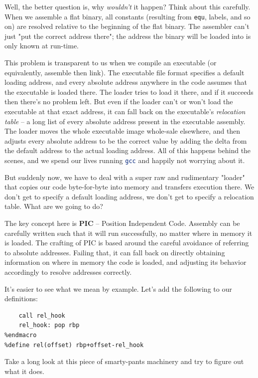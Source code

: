 \documentclass{article}
\newcommand{\xcode}[2]{\colorbox{ubuntuback}{\lstinline[language=#1]|#2|}}
\newcommand{\asm}[1]{\xcode{{[x86masm]assembler}}{#1}}
\begin{document}
Well, the better question is, why \textit{wouldn't} it happen? Think about this carefully. When we assemble a flat binary, all constants (resulting from \asm{equ}, labels, and so on) are resolved relative to the beginning of the flat binary. The assembler can't just "put the correct address there"; the address the binary will be loaded into is only known at run-time.

This problem is transparent to us when we compile an executable (or equivalently, assemble then link). The executable file format specifies a default loading address, and every absolute address anywhere in the code assumes that the executable is loaded there. The loader tries to load it there, and if it succeeds then there's no problem left. But even if the loader can't or won't load the executable at that exact address, it can fall back on the executable's \textit{relocation table} -- a long list of every absolute address present in the executable assembly. The loader moves the whole executable image whole-sale elsewhere, and then adjusts every absolute address to be the correct value by adding the delta from the default address to the actual loading address. All of this happens behind the scenes, and we spend our lives running \xcode{bash}{gcc} and happily not worrying about it.

But suddenly now, we have to deal with a super raw and rudimentary "loader" that copies our code byte-for-byte into memory and transfers execution there. We don't get to specify a default loading address, we don't get to specify a relocation table. What are we going to do?

The key concept here is \textbf{PIC} -- Position Independent Code. Assembly can be carefully written such that it will run successfully, no matter where in memory it is loaded. The crafting of PIC is based around the careful avoidance of referring to absolute addresses. Failing that, it can fall back on directly obtaining information on where in memory the code is loaded, and adjusting its behavior accordingly to resolve addresses correctly.

It's easier to see what we mean by example. Let's add the following to our definitions:

\begin{lstlisting}[language={[x86masm]assembler}]
%macro rel_init 0
    call rel_hook
    rel_hook: pop rbp
%endmacro
%define rel(offset) rbp+offset-rel_hook
\end{lstlisting}

Take a long look at this piece of smarty-pants machinery and try to figure out what it does.
\end{document}
